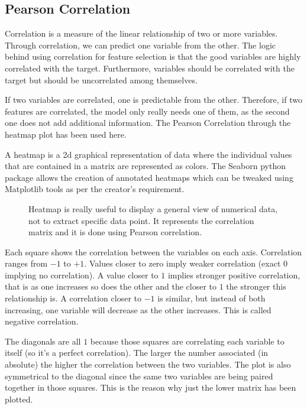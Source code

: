 \subsection{Pearson Correlation}
\label{sec:pearsoncorr}
Correlation is a measure of the linear relationship of two or more variables. Through correlation, we can predict one variable from the other. The logic behind using correlation for feature selection is that the good variables are highly correlated with the target. Furthermore, variables should be correlated with the target but should be uncorrelated among themselves.

\noindent If two variables are correlated, one is predictable from the other. Therefore, if two features are correlated, the model only really needs one of them, as the second one does not add additional information. The Pearson Correlation through the heatmap plot has been used here.

\noindent A heatmap is a \gls{2d} graphical representation of data where the individual values that are contained in a matrix are represented as colors. The Seaborn python package allows the creation of annotated heatmaps which can be tweaked using Matplotlib tools as per the creator’s requirement.

\begin{figure}[H]
	\caption[Heatmap.]{Heatmap is really useful to display a general view of numerical data, not to extract specific data point. It represents the correlation matrix and it is done using Pearson correlation.}\label{fig:correlation}
\end{figure}

\noindent Each square shows the correlation between the variables on each axis. Correlation ranges from $-1$ to $+1$. Values closer to zero imply weaker correlation (exact $0$ implying no correlation). A value closer to $1$ implies stronger positive correlation, that is as one increases so does the other and the closer to $1$ the stronger this relationship is. A correlation closer to $-1$ is similar, but instead of both increasing, one variable will decrease as the other increases. This is called negative correlation.

\noindent The diagonals are all $1$ because those squares are correlating each variable to itself (so it's a perfect correlation). The larger the number associated (in absolute) the higher the correlation between the two variables. The plot is also symmetrical to the diagonal since the same two variables are being paired together in those squares. This is the reason why just the lower matrix has been plotted.

